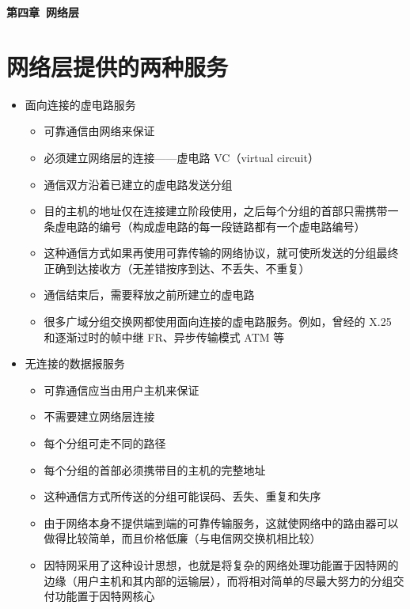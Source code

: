 \documentclass[cs4size,a4paper,10pt]{ctexart}
\begin{document}
	\begin{center}
		{\huge\textbf{第四章\ 网络层}}
	\end{center}
	\tableofcontents
	\clearpage

	\setcounter{page}{1}
	\setlength{\parskip}{0.65em}

	\section{网络层提供的两种服务}

	\begin{itemize}
		\item 面向连接的虚电路服务
		\begin{itemize}
			\item 可靠通信由网络来保证
			\item 必须建立网络层的连接——虚电路 VC（virtual circuit）
			\item 通信双方沿着已建立的虚电路发送分组
			\item 目的主机的地址仅在连接建立阶段使用，之后每个分组的首部只需携带一条虚电路的编号（构成虚电路的每一段链路都有一个虚电路编号）
			\item 这种通信方式如果再使用可靠传输的网络协议，就可使所发送的分组最终正确到达接收方（无差错按序到达、不丢失、不重复）
			\item 通信结束后，需要释放之前所建立的虚电路
			\item 很多广域分组交换网都使用面向连接的虚电路服务。例如，曾经的 X.25 和逐渐过时的帧中继 FR、异步传输模式 ATM 等
		\end{itemize}
		\item 无连接的数据报服务
		\begin{itemize}
			\item 可靠通信应当由用户主机来保证
			\item 不需要建立网络层连接
			\item 每个分组可走不同的路径
			\item 每个分组的首部必须携带目的主机的完整地址
			\item 这种通信方式所传送的分组可能误码、丢失、重复和失序
			\item 由于网络本身不提供端到端的可靠传输服务，这就使网络中的路由器可以做得比较简单，而且价格低廉（与电信网交换机相比较）
			\item 因特网采用了这种设计思想，也就是将复杂的网络处理功能置于因特网的边缘（用户主机和其内部的运输层），而将相对简单的尽最大努力的分组交付功能置于因特网核心
		\end{itemize}
	\end{itemize}
\end{document}

